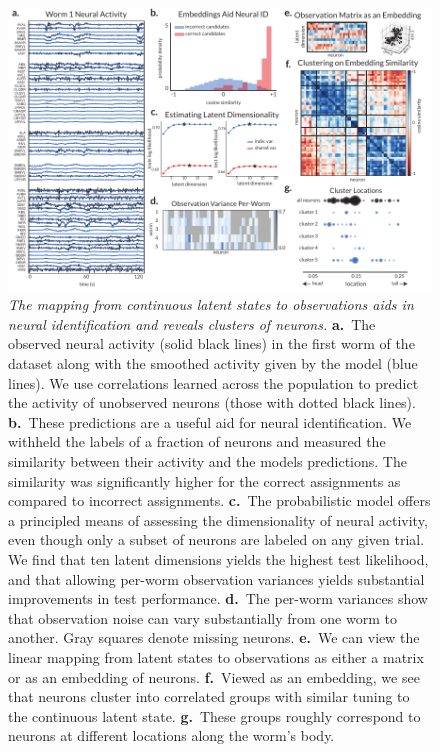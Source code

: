 \documentclass[11pt]{article}
\begin{document}
\begin{figure}[t!]
\centering
\includegraphics[width=6in]{figures/figure2} 
\caption{ \textit{The mapping from continuous latent states to
    observations aids in neural identification and reveals clusters of
    neurons.}
  \textbf{a.}~The observed neural activity (solid black lines) in the
  first worm of the \citet{kato2015global} dataset along with the
  smoothed activity given by the model (blue lines). We use
  correlations learned across the population to predict the activity
  of unobserved neurons (those with dotted black lines).
  \textbf{b.}~These predictions are a useful aid for neural identification.
  We withheld the labels of a fraction of neurons and measured the similarity
  between their activity and the models predictions.  The similarity was
  significantly higher for the correct assignments as compared to incorrect
  assignments.
  \textbf{c.}~The probabilistic model offers a principled means of assessing
  the dimensionality of neural activity, even though only a subset of neurons
  are labeled on any given trial.  We find that ten latent dimensions yields
  the highest test likelihood, and that allowing per-worm observation variances
  yields substantial improvements in test performance.
  \textbf{d.}~The per-worm variances show that observation noise can
  vary substantially from one worm to another. Gray squares denote missing
  neurons.
  \textbf{e.}~We can view the linear mapping from latent states to observations
  as either a matrix or as an embedding of neurons.
  \textbf{f.}~Viewed as an embedding, we see that neurons cluster into
  correlated groups with similar tuning to the continuous latent state.
  \textbf{g.}~These groups roughly correspond to neurons at different
  locations along the worm's body.  }
\label{fig:emissions}
\end{figure}
\end{document}
